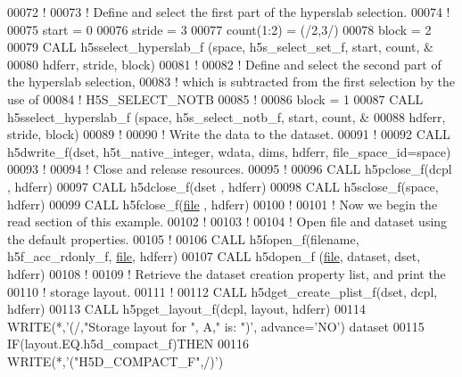 \begin{DoxyCode}
00072   \textcolor{comment}{!}
00073   \textcolor{comment}{! Define and select the first part of the hyperslab selection.}
00074   \textcolor{comment}{!}
00075   start = 0
00076   stride = 3
00077   count(1:2) = (/2,3/)
00078   block = 2
00079   \textcolor{keyword}{CALL }h5sselect\_hyperslab\_f (space, h5s\_select\_set\_f, start, count, &
00080        hdferr, stride, block)
00081   \textcolor{comment}{!}
00082   \textcolor{comment}{! Define and select the second part of the hyperslab selection,}
00083   \textcolor{comment}{! which is subtracted from the first selection by the use of}
00084   \textcolor{comment}{! H5S\_SELECT\_NOTB}
00085   \textcolor{comment}{!}
00086   block = 1
00087   \textcolor{keyword}{CALL }h5sselect\_hyperslab\_f (space, h5s\_select\_notb\_f, start, count, &
00088        hdferr, stride, block)
00089   \textcolor{comment}{!}
00090   \textcolor{comment}{! Write the data to the dataset.}
00091   \textcolor{comment}{!}
00092   \textcolor{keyword}{CALL }h5dwrite\_f(dset, h5t\_native\_integer, wdata, dims, hdferr, file\_space\_id=space)
00093   \textcolor{comment}{!}
00094   \textcolor{comment}{! Close and release resources.}
00095   \textcolor{comment}{!}
00096   \textcolor{keyword}{CALL }h5pclose\_f(dcpl , hdferr)
00097   \textcolor{keyword}{CALL }h5dclose\_f(dset , hdferr)
00098   \textcolor{keyword}{CALL }h5sclose\_f(space, hdferr)
00099   \textcolor{keyword}{CALL }h5fclose\_f(\hyperlink{structfile}{file} , hdferr)
00100   \textcolor{comment}{!}
00101   \textcolor{comment}{! Now we begin the read section of this example.}
00102   \textcolor{comment}{!}
00103   \textcolor{comment}{!}
00104   \textcolor{comment}{! Open file and dataset using the default properties.}
00105   \textcolor{comment}{!}
00106   \textcolor{keyword}{CALL }h5fopen\_f(filename, h5f\_acc\_rdonly\_f, \hyperlink{structfile}{file}, hdferr)
00107   \textcolor{keyword}{CALL }h5dopen\_f (\hyperlink{structfile}{file}, dataset, dset, hdferr)
00108   \textcolor{comment}{!}
00109   \textcolor{comment}{! Retrieve the dataset creation property list, and print the}
00110   \textcolor{comment}{! storage layout.}
00111   \textcolor{comment}{!}
00112   \textcolor{keyword}{CALL }h5dget\_create\_plist\_f(dset, dcpl, hdferr)
00113   \textcolor{keyword}{CALL }h5pget\_layout\_f(dcpl, layout, hdferr)
00114   \textcolor{keyword}{WRITE}(*,\textcolor{stringliteral}{'(/,"Storage layout for ", A," is: ")'}, advance=\textcolor{stringliteral}{'NO'}) dataset
00115   \textcolor{keywordflow}{IF}(layout.EQ.h5d\_compact\_f)\textcolor{keywordflow}{THEN}
00116      \textcolor{keyword}{WRITE}(*,\textcolor{stringliteral}{'("H5D\_COMPACT\_F",/)'})

\end{DoxyCode}
